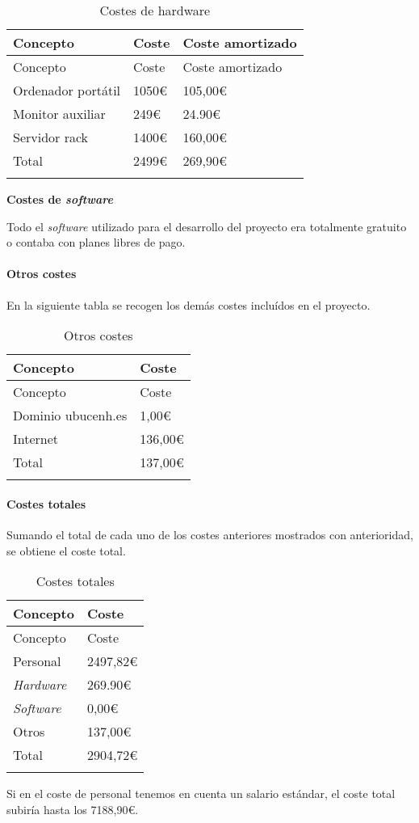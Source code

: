 \begin{longtable}[]{@{}lll@{}}
\toprule
Concepto & Coste & Coste amortizado\tabularnewline
\midrule
\endfirsthead
\toprule
Concepto & Coste & Coste amortizado\tabularnewline
\midrule
\endhead
Ordenador portátil & 1050\euro{} & 105,00\euro{}\tabularnewline
Monitor auxiliar & 249\euro{} & 24.90\euro{}\tabularnewline
Servidor rack & 1400\euro{} & 160,00\euro{}\tabularnewline
Total & 2499\euro{} & 269,90\euro{}\tabularnewline
\bottomrule
\caption{Costes de hardware}\tabularnewline
\end{longtable}

\textbf{Costes de \emph{software}}

Todo el \emph{software} utilizado para el desarrollo del proyecto era
totalmente gratuito o contaba con planes libres de pago.

\paragraph{Otros costes}

En la siguiente tabla se recogen los demás costes incluídos en el
proyecto.

\begin{longtable}[]{@{}ll@{}}
\toprule
Concepto & Coste\tabularnewline
\midrule
\endfirsthead
\toprule
Concepto & Coste\tabularnewline
\midrule
\endhead
Dominio ubucenh.es & 1,00\euro{}\tabularnewline
Internet & 136,00\euro{}\tabularnewline
Total & 137,00\euro{}\tabularnewline
\bottomrule
\caption{Otros costes}\tabularnewline
\end{longtable}

\paragraph{Costes totales}

Sumando el total de cada uno de los costes anteriores mostrados con
anterioridad, se obtiene el coste total.

\begin{longtable}[]{@{}ll@{}}
\toprule
Concepto & Coste\tabularnewline
\midrule
\endfirsthead
\toprule
Concepto & Coste\tabularnewline
\midrule
\endhead
Personal & 2497,82\euro{}\tabularnewline
\emph{Hardware} & 269.90\euro{}\tabularnewline
\emph{Software} & 0,00\euro{}\tabularnewline
Otros & 137,00\euro{}\tabularnewline
Total & 2904,72\euro{}\tabularnewline
\bottomrule
\caption{Costes totales}\tabularnewline
\end{longtable}

Si en el coste de personal tenemos en cuenta un salario estándar,
el coste total subiría hasta los 7188,90\euro{}.

